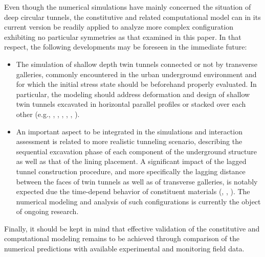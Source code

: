 \documentclass[Journal,letterpaper, NoLists,SectionNumbers]{ascelike-new}
\begin{document}
Even though the numerical simulations have mainly concerned the situation of deep circular tunnels, the constitutive and related computational model can in its current version be readily applied to analyze more complex configuration exhibiting no particular symmetries as that examined in this paper. In that respect, the following developments may be foreseen in the immediate future:

\begin{itemize}
	
	\item The simulation of shallow depth twin tunnels connected or not by transverse galleries, commonly encountered in the urban underground environment and for which the initial stress state should be beforehand properly evaluated. In particular, the modeling should address deformation and design of shallow twin tunnels excavated in horizontal parallel profiles or stacked over each other (e.g., , , , , ,  ).

	\item An important aspect to be integrated in the simulations and interaction assessment is related to more realistic tunneling scenario, describing the sequential excavation phase of each component of the underground structure as well as that of the lining placement. A significant impact of the lagged tunnel construction procedure, and more specifically the lagging distance between the faces of twin tunnels as well as of transverse galleries, is notably expected due the time-depend behavior of constituent materials (, , ). The numerical modeling and analysis of such configurations is currently the object of ongoing research.
	
\end{itemize}

Finally, it should be kept in mind that effective validation of the constitutive and computational modeling remains to be achieved through comparison of the numerical predictions with available experimental and monitoring field data.


%
%

%
\end{document}
